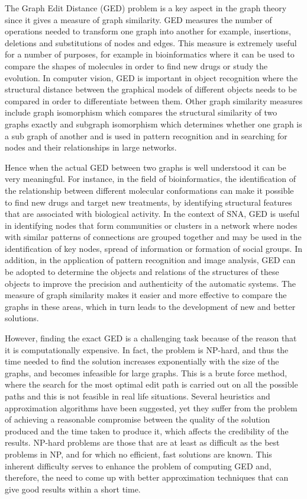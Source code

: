 \documentclass[../Thesis.tex]{subfiles}
\begin{document}
	The Graph Edit Distance (GED) problem is a key aspect in the graph theory since it gives a measure of graph similarity. GED measures the number of operations needed to transform one graph into another for example, insertions, deletions and substitutions of nodes and edges. This measure is extremely useful for a number of purposes, for example in bioinformatics where it can be used to compare the shapes of molecules in order to find new drugs or study the evolution. In computer vision, GED is important in object recognition where the structural distance between the graphical models of different objects needs to be compared in order to differentiate between them. Other graph similarity measures include graph isomorphism which compares the structural similarity of two graphs exactly and subgraph isomorphism which determines whether one graph is a sub graph of another and is used in pattern recognition and in searching for nodes and their relationships in large networks.
	
	Hence when the actual GED between two graphs is well understood it can be very meaningful. For instance, in the field of bioinformatics, the identification of the relationship between different molecular conformations can make it possible to find new drugs and target new treatments, by identifying structural features that are associated with biological activity. In the context of SNA, GED is useful in identifying nodes that form communities or clusters in a network where nodes with similar patterns of connections are grouped together and may be used in the identification of key nodes, spread of information or formation of social groups. In addition, in the application of pattern recognition and image analysis, GED can be adopted to determine the objects and relations of the structures of these objects to improve the precision and authenticity of the automatic systems. The measure of graph similarity makes it easier and more effective to compare the graphs in these areas, which in turn leads to the development of new and better solutions.
	
	However, finding the exact GED is a challenging task because of the reason that it is computationally expensive. In fact, the problem is NP-hard, and thus the time needed to find the solution increases exponentially with the size of the graphs, and becomes infeasible for large graphs. This is a brute force method, where the search for the most optimal edit path is carried out on all the possible paths and this is not feasible in real life situations. Several heuristics and approximation algorithms have been suggested, yet they suffer from the problem of achieving a reasonable compromise between the quality of the solution produced and the time taken to produce it, which affects the credibility of the results. NP-hard problems are those that are at least as difficult as the best problems in NP, and for which no efficient, fast solutions are known. This inherent difficulty serves to enhance the problem of computing GED and, therefore, the need to come up with better approximation techniques that can give good results within a short time.
\end{document}
